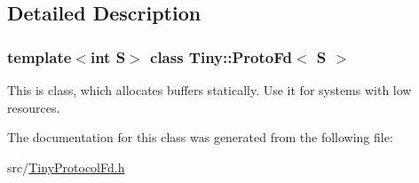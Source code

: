 \subsection{Detailed Description}
\subsubsection*{template$<$int S$>$\newline
class Tiny\+::\+Proto\+Fd$<$ S $>$}

This is class, which allocates buffers statically. Use it for systems with low resources. 

The documentation for this class was generated from the following file\+:\begin{DoxyCompactItemize}
\item 
src/\hyperlink{TinyProtocolFd_8h}{Tiny\+Protocol\+Fd.\+h}\end{DoxyCompactItemize}
